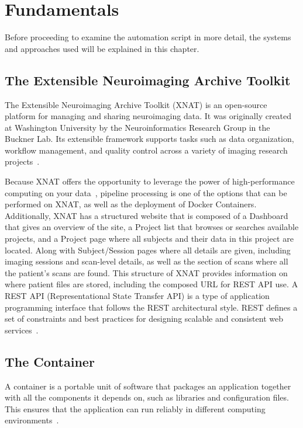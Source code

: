 
\chapter{Fundamentals}

Before proceeding to examine the automation script in more detail, the systems and approaches used will be explained in this chapter.

\section{The Extensible Neuroimaging Archive Toolkit}
The Extensible Neuroimaging Archive Toolkit (XNAT) is an open-source platform for managing and sharing neuroimaging data. It was originally created at Washington University by the Neuroinformatics Research Group in the Buckner Lab. Its extensible framework supports tasks such as data organization, workflow management, and quality control across a variety of imaging research projects~\cite{xnat_about}.

Because XNAT offers the opportunity to leverage the power of high-performance computing on your data~\cite{zaschke_extending_2024}, 
pipeline processing is one of the options that can be performed on XNAT, as well as the deployment of Docker Containers.
\\
Additionally, XNAT has a structured website that is composed of a Dashboard that gives an overview of the site, a Project list that browses or searches available projects, and a Project page where all subjects and their data in this project are located. Along with Subject/Session pages where all details are given, including imaging sessions and scan-level details, as well as the section of scans where all the patient’s scans are found. 
This structure of XNAT provides information on where patient files are stored, including the composed URL for REST API use. A REST API (Representational State Transfer API) is a type of application programming interface that follows the REST architectural style. REST defines a set of constraints and best practices for designing scalable and consistent web services~\cite{REST_API}.

\section{The Container} 
A container is a portable unit of software that packages an application together with all the components it depends on, such as libraries and configuration files. This ensures that the application can run reliably in different computing environments~\cite{DockerContainer}.


